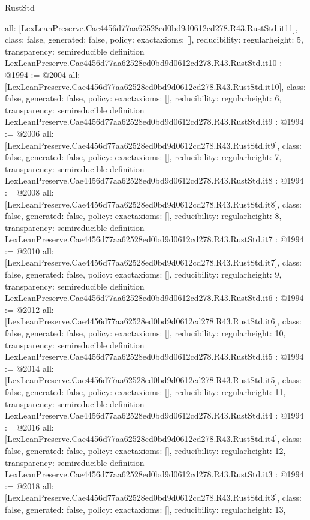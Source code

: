\begin{lexlean}{RustStd}
\begin{coremodule}
{  all: [LexLeanPreserve.Cae4456d77aa62528ed0bd9d0612cd278.R43.RustStd.it11],
  class: false,
  generated: false,
  policy: exact{axioms: []},
  reducibility: regular{height: 5},
  transparency: semireducible
}
definition LexLeanPreserve.Cae4456d77aa62528ed0bd9d0612cd278.R43.RustStd.it10 : @1994 := @2004 {
  all: [LexLeanPreserve.Cae4456d77aa62528ed0bd9d0612cd278.R43.RustStd.it10],
  class: false,
  generated: false,
  policy: exact{axioms: []},
  reducibility: regular{height: 6},
  transparency: semireducible
}
definition LexLeanPreserve.Cae4456d77aa62528ed0bd9d0612cd278.R43.RustStd.it9 : @1994 := @2006 {
  all: [LexLeanPreserve.Cae4456d77aa62528ed0bd9d0612cd278.R43.RustStd.it9],
  class: false,
  generated: false,
  policy: exact{axioms: []},
  reducibility: regular{height: 7},
  transparency: semireducible
}
definition LexLeanPreserve.Cae4456d77aa62528ed0bd9d0612cd278.R43.RustStd.it8 : @1994 := @2008 {
  all: [LexLeanPreserve.Cae4456d77aa62528ed0bd9d0612cd278.R43.RustStd.it8],
  class: false,
  generated: false,
  policy: exact{axioms: []},
  reducibility: regular{height: 8},
  transparency: semireducible
}
definition LexLeanPreserve.Cae4456d77aa62528ed0bd9d0612cd278.R43.RustStd.it7 : @1994 := @2010 {
  all: [LexLeanPreserve.Cae4456d77aa62528ed0bd9d0612cd278.R43.RustStd.it7],
  class: false,
  generated: false,
  policy: exact{axioms: []},
  reducibility: regular{height: 9},
  transparency: semireducible
}
definition LexLeanPreserve.Cae4456d77aa62528ed0bd9d0612cd278.R43.RustStd.it6 : @1994 := @2012 {
  all: [LexLeanPreserve.Cae4456d77aa62528ed0bd9d0612cd278.R43.RustStd.it6],
  class: false,
  generated: false,
  policy: exact{axioms: []},
  reducibility: regular{height: 10},
  transparency: semireducible
}
definition LexLeanPreserve.Cae4456d77aa62528ed0bd9d0612cd278.R43.RustStd.it5 : @1994 := @2014 {
  all: [LexLeanPreserve.Cae4456d77aa62528ed0bd9d0612cd278.R43.RustStd.it5],
  class: false,
  generated: false,
  policy: exact{axioms: []},
  reducibility: regular{height: 11},
  transparency: semireducible
}
definition LexLeanPreserve.Cae4456d77aa62528ed0bd9d0612cd278.R43.RustStd.it4 : @1994 := @2016 {
  all: [LexLeanPreserve.Cae4456d77aa62528ed0bd9d0612cd278.R43.RustStd.it4],
  class: false,
  generated: false,
  policy: exact{axioms: []},
  reducibility: regular{height: 12},
  transparency: semireducible
}
definition LexLeanPreserve.Cae4456d77aa62528ed0bd9d0612cd278.R43.RustStd.it3 : @1994 := @2018 {
  all: [LexLeanPreserve.Cae4456d77aa62528ed0bd9d0612cd278.R43.RustStd.it3],
  class: false,
  generated: false,
  policy: exact{axioms: []},
  reducibility: regular{height: 13},
}
\end{coremodule}
\end{lexlean}
